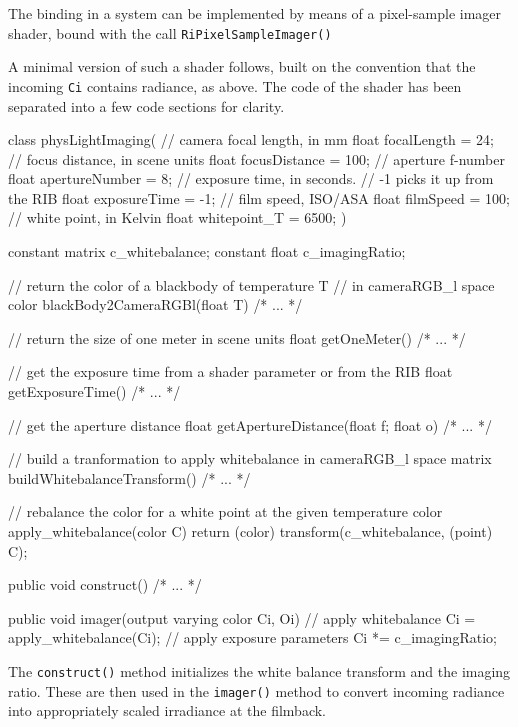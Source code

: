The binding in a  system can be implemented by means of a
pixel-sample imager shader, bound with the call \Verb|RiPixelSampleImager()|

A minimal version of such a shader follows, built on the convention that the
incoming \Verb|Ci| contains radiance, as above. The code of the shader has been
separated into a few code sections for clarity.

\begin{rslcode}
class physLightImaging(
    // camera focal length, in mm
    float focalLength = 24;
    // focus distance, in scene units
    float focusDistance = 100;
    // aperture f-number
    float apertureNumber = 8;
    // exposure time, in seconds.
    // -1 picks it up from the RIB
    float exposureTime = -1;
    // film speed, ISO/ASA
    float filmSpeed = 100;
    // white point, in Kelvin
    float whitepoint_T = 6500;
)
{
    constant matrix c_whitebalance;
    constant float  c_imagingRatio;

    // return the color of a blackbody of temperature T
    // in cameraRGB\_l space
    color blackBody2CameraRGBl(float T) { /* ... */ }

    // return the size of one meter in scene units
    float getOneMeter() { /* ... */ }

    // get the exposure time from a shader parameter or from the RIB
    float getExposureTime() { /* ... */ }

    // get the aperture distance
    float getApertureDistance(float f; float o) { /* ... */ }

    // build a tranformation to apply whitebalance in cameraRGB\_l space
    matrix buildWhitebalanceTransform() { /* ... */ }

    // rebalance the color for a white point at the given temperature
    color apply_whitebalance(color C)
    {
        return (color) transform(c_whitebalance, (point) C);
    }

    public void construct() { /* ... */ }

    public void imager(output varying color Ci, Oi)
    {
        // apply whitebalance
        Ci = apply_whitebalance(Ci);
        // apply exposure parameters
        Ci *= c_imagingRatio;
    }
}
\end{rslcode}


The \Verb|construct()| method initializes the white balance transform and the
imaging ratio. These are then used in the \Verb|imager()| method to convert
incoming radiance into appropriately scaled irradiance at the \gls{filmback}.

